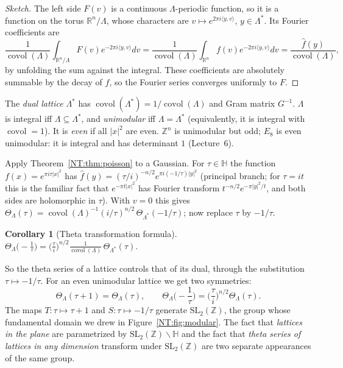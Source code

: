\documentclass[11pt,openany]{book}
\theoremstyle{plain}
\newtheorem{corollary}[theorem]{Corollary}
\theoremstyle{definition}
\theoremstyle{remark}
\newcommand{\R}{\mathbb{R}}
\newcommand{\Z}{\mathbb{Z}}
\newcommand{\Lat}{\Lambda}             %
\newcommand{\covol}{\operatorname{covol}}
\newcommand{\SL}{\mathrm{SL}}
\newcommand{\abs}[1]{\left\lvert #1 \right\rvert}
\newcommand{\ip}[2]{\langle #1, #2\rangle}
\begin{document}
\begin{proof}[Sketch]
The left side $F(v)$ is a continuous $\Lat$-periodic function, so it is a function on the torus
$\R^n/\Lat$, whose characters are $v\mapsto e^{2\pi i\ip yv}$, $y\in\Lat^*$. Its Fourier coefficients are
\[
  \frac{1}{\covol(\Lat)}\int_{\R^n/\Lat}F(v)e^{-2\pi i\ip yv}dv
  =\frac{1}{\covol(\Lat)}\int_{\R^n}f(v)e^{-2\pi i\ip yv}dv=\frac{\hat f(y)}{\covol(\Lat)},
\]
by unfolding the sum against the integral. These coefficients are absolutely summable by the decay of
$\hat f$, so the Fourier series converges uniformly to $F$.
\end{proof}

The \emph{dual lattice} $\Lat^*$ has $\covol(\Lat^*)=1/\covol(\Lat)$ and Gram matrix $G^{-1}$. $\Lat$ is
integral iff $\Lat\subseteq\Lat^*$, and \emph{unimodular} iff $\Lat=\Lat^*$ (equivalently, it is integral with
$\covol=1$). It is \emph{even} if all $\abs x^2$ are even. $\Z^n$ is unimodular but odd; $E_8$ is even
unimodular: it is integral and has determinant $1$ (Lecture~6).

Apply Theorem~\ref{NT:thm:poisson} to a Gaussian. For $\tau\in\mathbb H$ the function
$f(x)=e^{\pi i\tau\abs x^2}$ has $\hat f(y)=(\tau/i)^{-n/2}e^{\pi i(-1/\tau)\abs y^2}$ (principal branch;
for $\tau=it$ this is the familiar fact that $e^{-\pi t\abs x^2}$ has Fourier transform
$t^{-n/2}e^{-\pi\abs y^2/t}$, and both sides are holomorphic in $\tau$). With $v=0$ this gives $\Theta_\Lat(\tau)=\covol(\Lat)^{-1}(i/\tau)^{n/2}\,\Theta_{\Lat^*}(-1/\tau)$; now replace $\tau$ by $-1/\tau$.

\begin{corollary}[Theta transformation formula]\label{NT:cor:thetatrans}
$\displaystyle \Theta_\Lat\Big(-\frac1\tau\Big)=\Big(\frac\tau i\Big)^{n/2}\frac{1}{\covol(\Lat)}\,\Theta_{\Lat^*}(\tau).$
\end{corollary}

So the theta series of a lattice controls that of its dual, through the substitution $\tau\mapsto-1/\tau$.
For an even unimodular lattice we get two symmetries:
\begin{equation}\label{NT:eq:modular}
  \Theta_\Lat(\tau+1)=\Theta_\Lat(\tau),\qquad
  \Theta_\Lat\Big(-\frac1\tau\Big)=\Big(\frac\tau i\Big)^{n/2}\Theta_\Lat(\tau).
\end{equation}
The maps $T\colon\tau\mapsto\tau+1$ and $S\colon\tau\mapsto-1/\tau$ generate $\SL_2(\Z)$, the group
whose fundamental domain we drew in Figure~\ref{NT:fig:modular}. The fact that \emph{lattices in the
plane} are parametrized by $\SL_2(\Z)\backslash\mathbb H$ and the fact that \emph{theta series of lattices
in any dimension} transform under $\SL_2(\Z)$ are two separate appearances of the same group.
\end{document}
